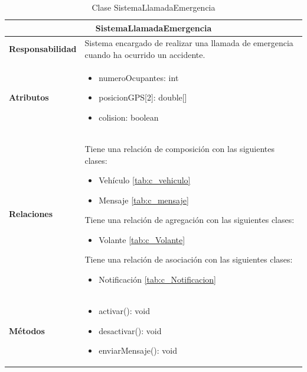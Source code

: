 \begin{table}[H]
\begin{center}
\begin{tabular}{p{} p{11cm}}
\multicolumn{2}{c}{\textbf{SistemaLlamadaEmergencia} } \\ \hline \hline
\textbf{Responsabilidad} &  Sistema encargado de realizar una llamada de emergencia cuando ha ocurrido un accidente.  \\ \hline
\textbf{Atributos} & \begin{itemize}
                      \item numeroOcupantes: int
                      \item posicionGPS[2]: double[]
                      \item colision: boolean
                    \end{itemize}\\ \hline
\textbf{Relaciones} & \par Tiene una relación de composición con las siguientes clases:
                      \begin{itemize}
                        \item Vehículo \ref{tab:c_vehiculo}
                        \item Mensaje \ref{tab:c_mensaje}
                      \end{itemize}

                      \par Tiene una relación de agregación con las siguientes clases:
                      \begin{itemize}
                        \item Volante \ref{tab:c_Volante}
                      \end{itemize}

                      \par Tiene una relación de asociación con las siguientes clases:
                      \begin{itemize}
                        \item Notificación \ref{tab:c_Notificacion}
                      \end{itemize}


                      \\ \hline

\textbf{Métodos} &  \begin{itemize}
                      \item activar(): void
                      \item desactivar(): void
                      \item enviarMensaje(): void
                    \end{itemize}\\ \hline
\end{tabular}
\caption{Clase SistemaLlamadaEmergencia}
\label{tab:c_SLEmerg}
\end{center}
\end{table}











